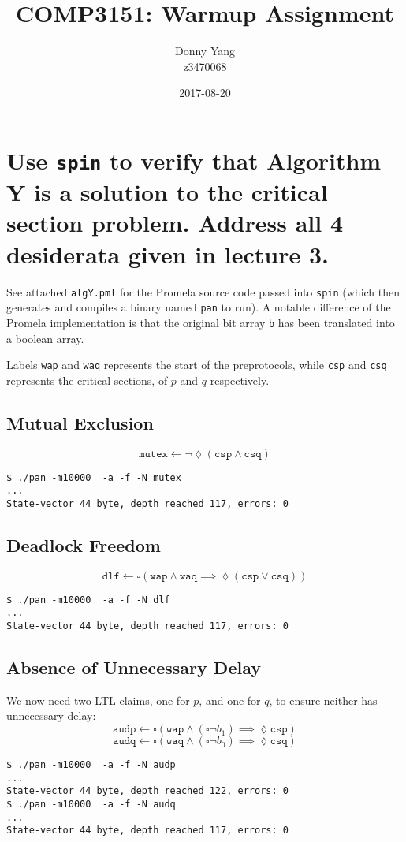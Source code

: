 \documentclass[a4paper]{scrartcl}
\newcommand{\always}{\square}
\newcommand{\eventually}{\lozenge}
\begin{document}
\title{COMP3151: Warmup Assignment}
\author{Donny Yang \\ z3470068}
\date{2017-08-20}
\maketitle

\section{Use \texttt{spin} to verify that Algorithm Y is a solution to the critical section problem. Address all 4 desiderata given in lecture 3.}
See attached \texttt{algY.pml} for the Promela source code passed into \texttt{spin} (which then generates and compiles a binary named \texttt{pan} to run). A notable difference of the Promela implementation is that the original bit array \texttt{b} has been translated into a boolean array.

Labels \texttt{wap} and \texttt{waq} represents the start of the preprotocols, while \texttt{csp} and \texttt{csq} represents the critical sections, of \(p\) and \(q\) respectively.

\subsection{Mutual Exclusion}
\[\texttt{mutex} \leftarrow \lnot \eventually(\texttt{csp} \land \texttt{csq})\]
\begin{lstlisting}
$ ./pan -m10000  -a -f -N mutex
...
State-vector 44 byte, depth reached 117, errors: 0
\end{lstlisting}

\subsection{Deadlock Freedom}
\[\texttt{dlf} \leftarrow \always(\texttt{wap} \land \texttt{waq} \implies \eventually(\texttt{csp} \lor \texttt{csq}))\]
\begin{lstlisting}
$ ./pan -m10000  -a -f -N dlf
...
State-vector 44 byte, depth reached 117, errors: 0
\end{lstlisting}

\subsection{Absence of Unnecessary Delay}
We now need two LTL claims, one for \(p\), and one for \(q\), to ensure neither has unnecessary delay:
\[\texttt{audp} \leftarrow \always(\texttt{wap} \land (\always \lnot b_1) \implies \eventually \texttt{csp})\]
\[\texttt{audq} \leftarrow \always(\texttt{waq} \land (\always \lnot b_0) \implies \eventually \texttt{csq})\]
\begin{lstlisting}
$ ./pan -m10000  -a -f -N audp
...
State-vector 44 byte, depth reached 122, errors: 0
$ ./pan -m10000  -a -f -N audq
...
State-vector 44 byte, depth reached 117, errors: 0
\end{lstlisting}
\end{document}
